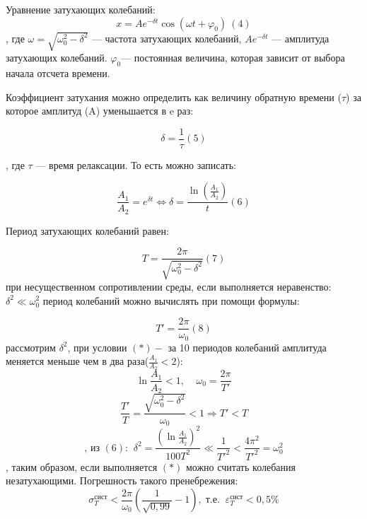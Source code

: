 \documentclass[a4paper,14pt]{extarticle}
\begin{document}
\begin{flushleft}
Уравнение затухающих колебаний:
$$x=Ae^{-\delta t}{\cos  \left(\omega t+{\varphi }_0\right)\ }\left(4\right)$$
, где $\omega =\sqrt{{\omega }^2_0-{\delta }^2}$ — частота затухающих колебаний, $Ae^{-\delta t}$ — амплитуда затухающих колебаний. ${\varphi }_0$— постоянная величина, которая зависит от выбора начала отсчета времени.

Коэффициент затухания можно определить как величину обратную времени ($\tau$) за которое амплитуд (A) уменьшается в e раз:

$$\delta =\frac{1}{\tau }\left(5\right)$$

, где $\tau$ — время релаксации. То есть можно записать:

$$\frac{A_1}{A_2}=e^{\delta t} \Leftrightarrow \delta = \frac{\ln(\frac{A_1}{A_2})}{t} \left(6\right)$$

Период затухающих колебаний равен:

$$T=\frac{2\pi }{\sqrt{{\omega }^2_0-{\delta }^2}}\left(7\right)$$
при несущественном сопротивлении среды, если выполняется неравенство: ${\delta }^2\ll {\omega }^2_0$ период колебаний можно вычислять при помощи формулы:

$$T'=\frac{2\pi }{{\omega }_0}\left(8\right)$$
рассмотрим $\delta^2$, при условии $\left(*\right) -$ за 10 периодов колебаний амплитуда меняется меньше чем в два раза($\frac{A_1}{A_2} < 2$):
$$\ln{\frac{A_1}{A_2}} < 1,\;\;\;\; \omega_0 = \frac{2\pi}{T'}$$ 
$$\frac{T'}{T} = \frac{\sqrt{\omega_0^2 - \delta^2}}{\omega_0} < 1 \Rightarrow T' < T$$
$$\text{, из $\left(6\right)$:}\;\; \delta^2 = \frac{(\ln{\frac{A_1}{A_2}})^2}{100T^2} \ll \frac{1}{T'^2} < \frac{4\pi^2}{T'^2} = \omega_0^2$$
, таким образом, если выполняется $\left(*\right)$ можно считать колебания незатухающими. Погрешность такого пренебрежения: 
$$\sigma_T^{\text{сист}} < \frac{2\pi}{\omega_0}(\frac{1}{\sqrt{0,99}} - 1),\; \text{т.е.} \;\; \varepsilon_T^{\text{сист}} < 0,5\% $$

\end{flushleft}
\end{document}

